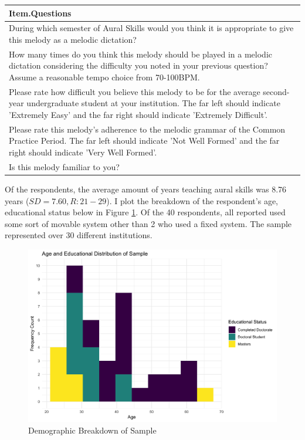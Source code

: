 \documentclass[]{book}
\begin{document}
\begin{tabular}{l}
\hline
Item.Questions\\
\hline
During which semester of Aural Skills would you think it is appropriate to give this melody as a melodic dictation?\\
\hline
How many times do you think this melody should be played in a melodic dictation considering the difficulty you noted in your previous question? Assume a reasonable tempo choice from 70-100BPM.\\
\hline
Please rate how difficult you believe this melody to be for the average second-year undergraduate student at your institution. The far left should indicate 'Extremely Easy' and the far right should indicate 'Extremely Difficult'.\\
\hline
Please rate this melody's adherence to the melodic grammar of the Common Practice Period. The far left should indicate 'Not Well Formed' and the far right should indicate 'Very Well Formed'.\\
\hline
Is this melody familiar to you?\\
\hline
\end{tabular}

Of the respondents, the average amount of years teaching aural skills was 8.76 years (\(SD = 7.60, R: 21-29\)).
I plot the breakdown of the respondent's age, educational status below in Figure \ref{fig:surveyageeducation}.
Of the 40 respondents, all reported used some sort of movable system other than 2 who used a fixed system.
The sample represented over 30 different institutions.

\begin{figure}

{\centering \includegraphics[width=0.8\linewidth]{img/age_ed_survey_distribution} 

}

\caption{Demographic Breakdown of Sample}\label{fig:surveyageeducation}
\end{figure}
\end{document}

